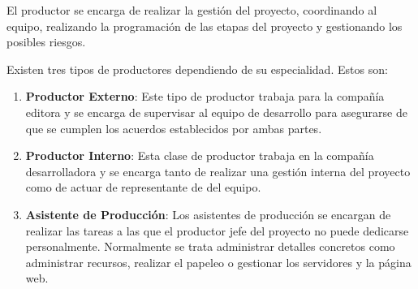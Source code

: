 El productor se encarga de realizar la gestión del proyecto, coordinando al equipo, realizando la programación de las etapas del proyecto y gestionando los posibles riesgos.

Existen tres tipos de productores dependiendo de su especialidad. Estos son:
\begin{enumerate}
\item \textbf{Productor Externo}: Este tipo de productor trabaja para la compañía editora y se encarga de supervisar al equipo de desarrollo para asegurarse de que se cumplen los acuerdos establecidos por ambas partes.
\item \textbf{Productor Interno}: Esta clase de productor trabaja en la compañía desarrolladora y se encarga tanto de realizar una gestión interna del proyecto como de actuar de representante de del equipo.
\item \textbf{Asistente de Producción}: Los asistentes de producción se encargan de realizar las tareas a las que el productor jefe del proyecto no puede dedicarse personalmente. Normalmente se trata administrar detalles concretos como administrar recursos, realizar el papeleo o gestionar los servidores y la página web.
\end{enumerate}
